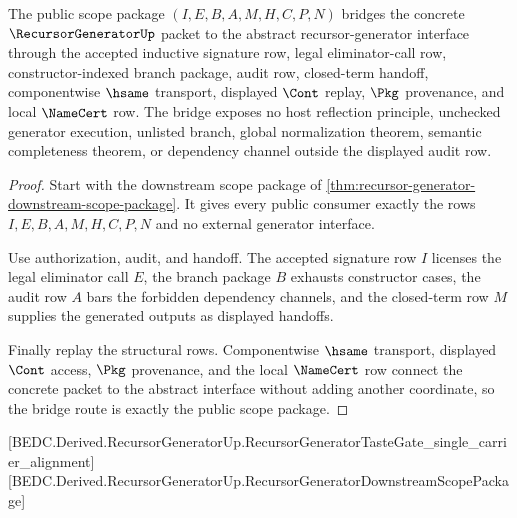 \begin{theorem}
\label{thm:recursor-generator-bridge-route-status}
The public scope package $(I,E,B,A,M,H,C,P,N)$ bridges the concrete $\RecursorGeneratorUp$ packet to the abstract recursor-generator interface through the accepted inductive signature row, legal eliminator-call row, constructor-indexed branch package, audit row, closed-term handoff, componentwise $\hsame$ transport, displayed $\Cont$ replay, $\Pkg$ provenance, and local $\NameCert$ row. The bridge exposes no host reflection principle, unchecked generator execution, unlisted branch, global normalization theorem, semantic completeness theorem, or dependency channel outside the displayed audit row.
\end{theorem}
\begin{proof}
Start with the downstream scope package of \autoref{thm:recursor-generator-downstream-scope-package}. It gives every public consumer exactly the rows $I,E,B,A,M,H,C,P,N$ and no external generator interface.

Use authorization, audit, and handoff. The accepted signature row $I$ licenses the legal eliminator call $E$, the branch package $B$ exhausts constructor cases, the audit row $A$ bars the forbidden dependency channels, and the closed-term row $M$ supplies the generated outputs as displayed handoffs.

Finally replay the structural rows. Componentwise $\hsame$ transport, displayed $\Cont$ access, $\Pkg$ provenance, and the local $\NameCert$ row connect the concrete packet to the abstract interface without adding another coordinate, so the bridge route is exactly the public scope package.
\end{proof}

[BEDC.Derived.RecursorGeneratorUp.RecursorGeneratorTasteGate\_single\_carrier\_alignment]
[BEDC.Derived.RecursorGeneratorUp.RecursorGeneratorDownstreamScopePackage]

